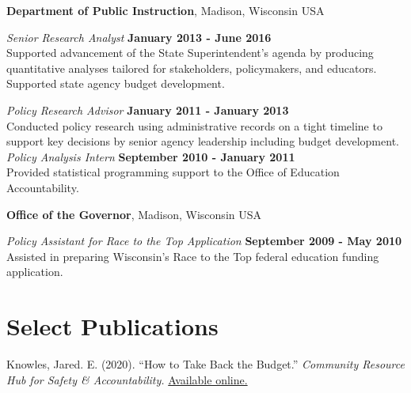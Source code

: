 \documentclass[margin,line]{res}
\newenvironment{list2}{
  \begin{list}{$\bullet$}{%
      \setlength{\itemsep}{0in}
      \setlength{\parsep}{0in} \setlength{\parskip}{0in}
      \setlength{\topsep}{0in} \setlength{\partopsep}{0in} 
      \setlength{\leftmargin}{0.2in}}}{\end{list}}
\begin{document}
\begin{resume}
\vspace{-.1cm}

{\bf Department of Public Instruction}, Madison, Wisconsin USA

\vspace{-.3cm}
{\em Senior Research Analyst} \hfill {\bf January 2013 - June 2016}\\
Supported advancement of the State Superintendent's agenda by producing quantitative 
analyses tailored for stakeholders, policymakers, and educators. Supported state agency budget development. \\

\vspace*{-.3cm}

{\em Policy Research Advisor} \hfill {\bf January 2011 - January 2013} \\
Conducted policy research using administrative records on a tight timeline to 
support key decisions by senior agency leadership including budget development. \\

\vspace{-.3cm}
{\em Policy Analysis Intern} \hfill {\bf September 2010 - January 2011}\\
Provided statistical programming support to the Office of Education Accountability.

{\bf Office of the Governor}, Madison, Wisconsin USA

\vspace{-.3cm}
{\em Policy Assistant for Race to the Top Application} \hfill {\bf September 2009 - May 2010}\\
Assisted in preparing Wisconsin's Race to the Top federal education funding 
application. 


\section{\sc Select Publications}
Knowles, Jared. E. (2020). ``How to Take Back the Budget.'' \emph{Community Resource 
Hub for Safety \& Accountability.} \href{https://communityresourcehub.org/resources/how-to-take-back-the-budget/}{Available online.}


\end{resume}
\end{document}
